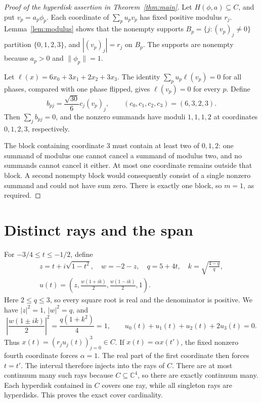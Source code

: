 \documentclass[11pt]{article}
\newcommand{\C}{\mathbb C}
\begin{document}
\begin{proof}[Proof of the hyperdisk assertion in Theorem~\ref{thm:main}]
Let $H(\phi,a)\subseteq C$, and put $v_p=a_p\phi_p$.
Each coordinate of $\sum_pu_pv_p$ has fixed positive modulus $r_j$.
Lemma~\ref{lem:modulus} shows that the nonempty supports
$B_p=\{j:(v_p)_j\ne0\}$ partition $\{0,1,2,3\}$, and
$|(v_p)_j|=r_j$ on $B_p$. The supports are nonempty because $a_p>0$
and $\|\phi_p\|=1$.

Let $\ell(x)=6x_0+3x_1+2x_2+3x_3$.
The identity $\sum_pu_p\ell(v_p)=0$ for all phases, compared with
one phase flipped, gives $\ell(v_p)=0$ for every $p$.
Define
\[
 b_{pj}=\frac{\sqrt{30}}6 c_j(v_p)_j,\qquad (c_0,c_1,c_2,c_3)=(6,3,2,3).
\]
Then $\sum_jb_{pj}=0$, and the nonzero summands have moduli
$1,1,1,2$ at coordinates $0,1,2,3$, respectively.

The block containing coordinate $3$ must contain at least two of
$0,1,2$: one summand of modulus one cannot cancel a summand of modulus
two, and no summands cannot cancel it either. At most one coordinate
remains outside that block. A second nonempty block would consequently
consist of a single nonzero summand and could not have sum zero.
There is exactly one block, so $m=1$, as required.
\end{proof}

\section{Distinct rays and the span}
For $-3/4\le t\le-1/2$, define
\begin{equation}\label{eq:phases}
 \begin{gathered}
 z=t+i\sqrt{1-t^2},\quad w=-2-z,\quad
 q=5+4t,\quad k=\sqrt{\frac{4-q}{q}},\\
 u(t)=\left(z,\frac{w(1+ik)}2,\frac{w(1-ik)}2,1\right).
 \end{gathered}
\end{equation}
Here $2\le q\le3$, so every square root is real and the denominator is
positive. We have $|z|^2=1$, $|w|^2=q$, and
\[
 \left|\frac{w(1\pm ik)}2\right|^2
 =\frac{q(1+k^2)}4=1,\qquad u_0(t)+u_1(t)+u_2(t)+2u_3(t)=0.
\]
Thus $x(t)=(r_ju_j(t))_{j=0}^3\in C$.
If $x(t)=\alpha x(t')$, the fixed nonzero fourth coordinate forces
$\alpha=1$. The real part of the first coordinate then forces $t=t'$.
The interval therefore injects into the rays of $C$. There are at most
continuum many such rays because $C\subseteq\C^4$, so there are exactly
continuum many. Each hyperdisk contained in $C$ covers one ray, while
all singleton rays are hyperdisks. This proves the exact cover cardinality.
\end{document}
